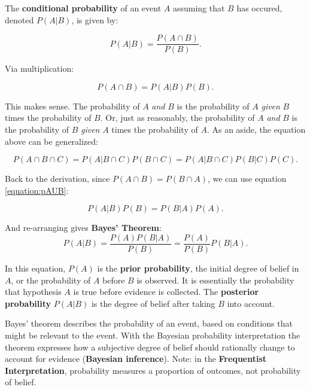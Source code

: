 \documentclass[
10pt, %
a4paper, %
oneside, %
headinclude,footinclude, %
BCOR5mm, %
]{scrartcl}
\begin{document}
The \textbf{conditional probability} of an event $A$ assuming that $B$ has occured, denoted $P(A|B)$, is given by:

\begin{equation}
P(A|B)=\frac{P(A \cap B)}{P(B)}.
\end{equation}

Via multiplication:

\begin{equation}
P(A \cap B) = P(A|B)P(B).
\label{equation:pAUB}
\end{equation}

This makes sense. The probability of $A$ \textit{and} $B$ is the probability of $A$ \textit{given} $B$ times the probability of $B$. Or, just as reasonably, the probability of $A$ \textit{and} $B$ is the probability of $B$ \textit{given} $A$ times the probability of $A$. As an aside, the equation above can be generalized:

\begin{equation}
P(A \cap B \cap C) = P(A|B \cap C) P(B \cap C) = P(A|B \cap C) P(B|C) P(C).
\end{equation}

Back to the derivation, since $P(A \cap B) = P(B \cap A)$, we can use equation \ref{equation:pAUB}:

\begin{equation}
P(A|B)P(B) = P(B|A)P(A).
\end{equation}

And re-arranging gives \textbf{Bayes' Theorem}:
\begin{equation}
P(A|B) = \frac{P(A)P(B|A)}{P(B)} = \frac{P(A)}{P(B)} P(B|A).
\label{equation:simpleBayes}
\end{equation}

In this equation, $P(A)$ is the \textbf{prior probability}, the initial degree of belief in $A$, or the probability of $A$ before $B$ is observed. It is essentially the probability that hypothesis $A$ is true before evidence is collected. The \textbf{posterior probability} $P(A|B)$ is the degree of belief after taking $B$ into account. 

Bayes' theorem describes the probability of an event, based on conditions that might be relevant to the event. With the Bayesian probability interpretation the theorem expresses how a subjective degree of belief should rationally change to account for evidence (\textbf{Bayesian inference}). Note: in the \textbf{Frequentist Interpretation}, probability measures a proportion of outcomes, not probability of belief. 
\end{document}
